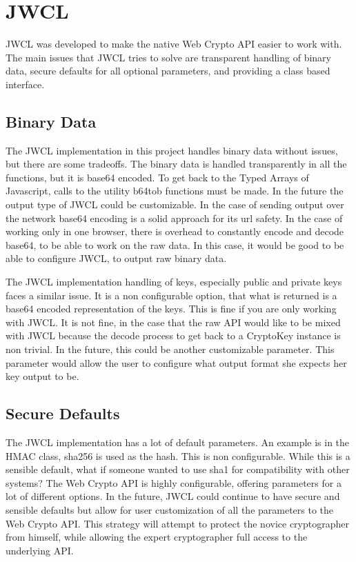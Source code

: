 \section{JWCL}


JWCL was developed to make the native Web Crypto API easier to work with. The main issues that JWCL tries to solve are transparent handling of binary data, secure defaults for all optional parameters, and providing a class based interface.


\subsection{Binary Data}


The JWCL implementation in this project handles binary data without issues, but there are some tradeoffs. The binary data is handled transparently in all the functions, but it is base64 encoded. To get back to the Typed Arrays of Javascript, calls to the utility b64tob functions must be made. In the future the output type of JWCL could be customizable. In the case of sending output over the network base64 encoding is a solid approach for its url safety. In the case of working only in one browser, there is overhead to constantly encode and decode base64, to be able to work on the raw data. In this case, it would be good to be able to configure JWCL, to output raw binary data.


The JWCL implementation handling of keys, especially public and private keys faces a similar issue. It is a non configurable option, that what is returned is a base64 encoded representation of the keys. This is fine if you are only working with JWCL. It is not fine, in the case that the raw API would like to be mixed with JWCL because the decode process to get back to a CryptoKey instance is non trivial. In the future, this could be another customizable parameter. This parameter would allow the user to configure what output format she expects her key output to be. 


\subsection{Secure Defaults}


The JWCL implementation has a lot of default parameters. An example is in the HMAC class, sha256 is used as the hash. This is non configurable. While this is a sensible default, what if someone wanted to use sha1 for compatibility with other systems? The Web Crypto API is highly configurable, offering parameters for a lot of different options. In the future, JWCL could continue to have secure and sensible defaults but allow for user customization of all the parameters to the Web Crypto API. This strategy will attempt to protect the novice cryptographer from himself, while allowing the expert cryptographer full access to the underlying API.


